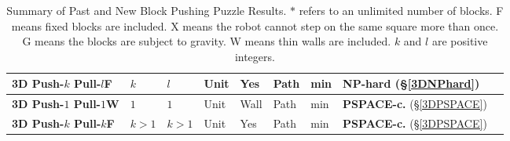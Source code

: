 \begin{table}
{\begin{tabular}{|l|l|l|l|l|l|l|l|l|}
\textbf{3D Push-$k$ Pull-$l$F} & $k$ & $l$ & Unit & Yes & Path & min &  \textbf{NP-hard} (\S  \ref{3DNPhard}) \\ \hline
\textbf{3D Push-$1$ Pull-$1$W} & $1$ & $1$ & Unit & Wall & Path & min &  \textbf{PSPACE-c.} (\S  \ref{3DPSPACE}) \\ \hline
\textbf{3D Push-$k$ Pull-$k$F} & $k > 1$ & $k >1$ & Unit & Yes & Path & min &  \textbf{PSPACE-c.} (\S  \ref{3DPSPACE}) \\ \hline
\end{tabular}
}
\caption{Summary of Past and New Block Pushing Puzzle Results. $*$ refers to an unlimited number of blocks. F means fixed blocks are included. X means the robot cannot step on the same square more than once. G means the blocks are subject to gravity. W means thin walls are included. $k$ and $l$ are positive integers.}
\label{BlocksTable}
\end{table}

